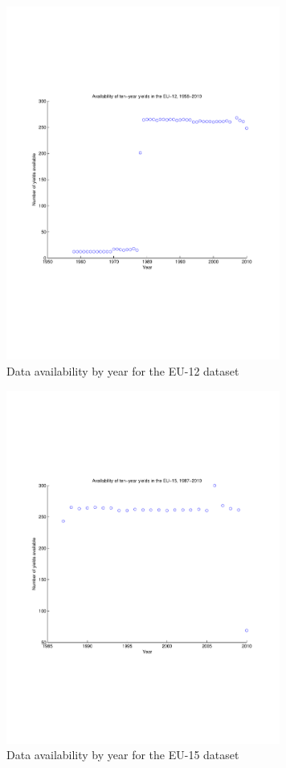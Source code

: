 \documentclass[3p]{elsarticle}
\begin{document}
\begin{figure}[h]
	\centering
	\includegraphics[width=9cm]{fig_data_eu12}
	\caption{Data availability by year for the EU-12 dataset}
	\label{fig:data_eu12}
\end{figure}

\begin{figure}[h]
	\centering
	\includegraphics[width=9cm]{fig_data_eu15}
	\caption{Data availability by year for the EU-15 dataset}
	\label{fig:data_eu15}
\end{figure}
\end{document}
